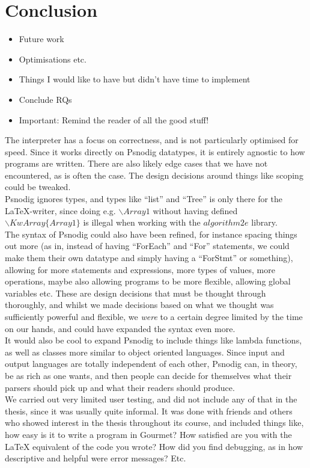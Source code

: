 \chapter{Conclusion}
\begin{itemize}
    \item Future work
    \item Optimisations etc.
    \item Things I would like to have but didn't have time to implement
    \item Conclude RQs
    \item Important: Remind the reader of all the good stuff!
\end{itemize}
The interpreter has a focus on correctness, and is not particularly optimised for speed. Since it works directly on Psnodig datatypes, it is entirely agnostic to how programs are written. There are also likely edge cases that we have not encountered, as is often the case. The design decisions around things like scoping could be tweaked. \hfill \\

Psnodig ignores types, and types like ``list'' and ``Tree'' is only there for the \LaTeX-writer, since doing e.g. $\backslash Array1$ without having defined $\backslash KwArray\{Array1\}$ is illegal when working with the $algorithm2e$ library. \hfill \\

The syntax of Psnodig could also have been refined, for instance spacing things out more (as in, instead of having ``ForEach'' and ``For'' statements, we could make them their own datatype and simply having a ``ForStmt'' or something), allowing for more statements and expressions, more types of values, more operations, maybe also allowing programs to be more flexible, allowing global variables etc. These are design decisions that must be thought through thoroughly, and whilst we made decisions based on what we thought was sufficiently powerful and flexible, we \textit{were} to a certain degree limited by the time on our hands, and could have expanded the syntax even more. \hfill \\

It would also be cool to expand Psnodig to include things like lambda functions, as well as classes more similar to object oriented languages. Since input and output languages are totally independent of each other, Psnodig can, in theory, be as rich as one wants, and then people can decide for themselves what their parsers should pick up and what their readers should produce. \hfill \\

We carried out very limited user testing, and did not include any of that in the thesis, since it was usually quite informal. It was done with friends and others who showed interest in the thesis throughout its course, and included things like, how easy is it to write a program in Gourmet? How satisfied are you with the LaTeX equivalent of the code you wrote? How did you find debugging, as in how descriptive and helpful were error messages? Etc.